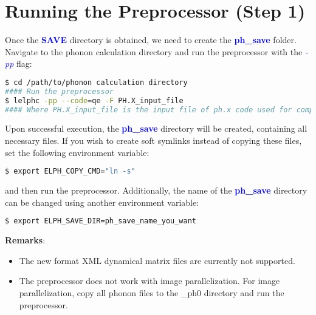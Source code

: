 \documentclass[12pt,twoside,openany]{book}
\begin{document}
\section{Running the Preprocessor (Step 1)}
Once the \textcolor{blue}{\bf{SAVE}} directory is obtained, we need to create the \textcolor{blue}{\bf{ph\_save}} folder. Navigate to the phonon calculation directory and run the preprocessor with the \textcolor{blue}{\emph{-pp}} flag:
\begin{lstlisting}[language=bash]
$ cd /path/to/phonon calculation directory
#### Run the preprocessor
$ lelphc -pp --code=qe -F PH.X_input_file
#### Where PH.X_input_file is the input file of ph.x code used for computing phonons
\end{lstlisting}
Upon successful execution, the \textcolor{blue}{\bf{ph\_save}} directory will be created, containing all necessary files.
If you wish to create soft symlinks instead of copying these files, set the following environment variable:
\begin{lstlisting}[language=bash]
$ export ELPH_COPY_CMD="ln -s"
\end{lstlisting}
and then run the preprocessor.
Additionally, the name of the \textcolor{blue}{\bf{ph\_save}} directory can be changed using another environment variable:
\begin{lstlisting}[language=bash]
$ export ELPH_SAVE_DIR=ph_save_name_you_want
\end{lstlisting}
\textbf{Remarks}:
\begin{itemize}
\item The new format XML dynamical matrix files are currently not supported.
\item The preprocessor does not work with image parallelization. For image parallelization, copy all phonon files to the \_ph0 directory 
and run the preprocessor.
\end{itemize}
\end{document}
